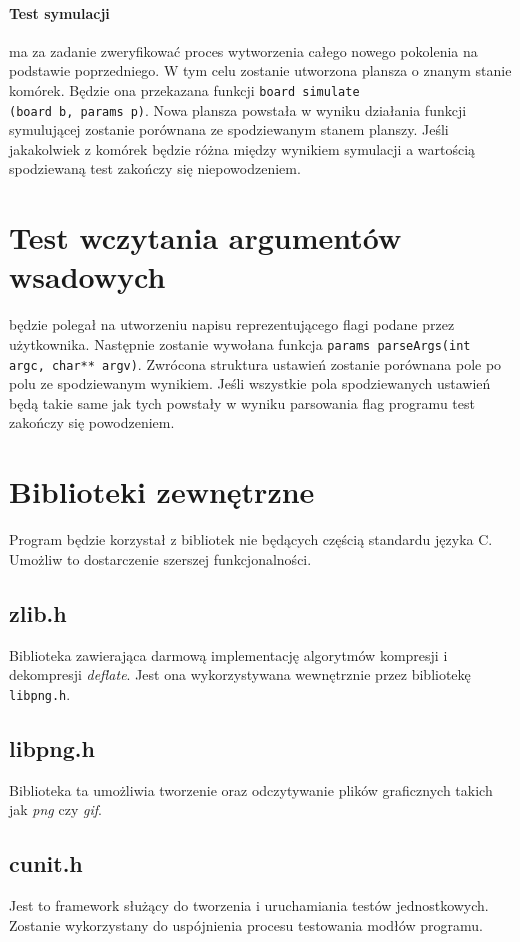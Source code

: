 \documentclass{article}
\begin{document}
\paragraph{Test symulacji} ma za zadanie zweryfikować proces wytworzenia całego nowego pokolenia na podstawie poprzedniego. W tym celu zostanie utworzona plansza o znanym stanie komórek. Będzie ona przekazana funkcji \texttt{board simulate\\(board b, params p)}. Nowa plansza powstała w wyniku działania funkcji symulującej zostanie porównana ze spodziewanym stanem planszy. Jeśli jakakolwiek z komórek będzie różna między wynikiem symulacji a wartością spodziewaną test zakończy się niepowodzeniem.

\section{Test wczytania argumentów wsadowych} będzie polegał na utworzeniu napisu reprezentującego flagi podane przez użytkownika. Następnie zostanie wywołana funkcja \texttt{params parseArgs(int argc, char** argv)}. Zwrócona struktura ustawień zostanie porównana pole po polu ze spodziewanym wynikiem. Jeśli wszystkie pola spodziewanych ustawień będą takie same jak tych powstały w wyniku parsowania flag programu test zakończy się powodzeniem.

\section{Biblioteki zewnętrzne}
Program będzie korzystał z bibliotek nie będących częścią standardu języka C. Umożliw to dostarczenie szerszej funkcjonalności.

\subsection{zlib.h}
Biblioteka zawierająca darmową implementację algorytmów kompresji i dekompresji \textit{deflate}. Jest ona wykorzystywana wewnętrznie przez bibliotekę \texttt{libpng.h}.

\subsection{libpng.h}
Biblioteka ta umożliwia tworzenie oraz odczytywanie plików graficznych takich jak \textit{png} czy \textit{gif}.

\subsection{cunit.h}
Jest to framework służący do tworzenia i uruchamiania testów jednostkowych. Zostanie wykorzystany do uspójnienia procesu testowania modłów programu.
\end{document}
